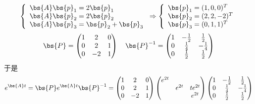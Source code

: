 \documentclass[12pt, a4paper, oneside, UTF8]{ctexbook}
\begin{document}
\begin{solution}
    \begin{align*}
        \left\{
            \begin{array}{ll}
                \bs{A}\bs{p}_1=2\bs{p}_1 \\
                \bs{A}\bs{p}_2=2\bs{p}_2 \\
                \bs{A}\bs{p}_3=\bs{p}_2+\bs{p}_3
            \end{array} 
            \right.
            \Rightarrow
            \left\{
            \begin{array}{ll}
                \bs{p}_1=(1,0,0)^T \\
                \bs{p}_2=(2,2,-2)^T \\
                \bs{p}_3=(0,1,1)^T
            \end{array} 
            \right.
    \end{align*}
    \begin{align*}
        \bs{P}=\begin{pmatrix}
            1 & 2 &0 \\
            0 & 2 &1 \\
            0 & -2 & 1
        \end{pmatrix} \quad
        \bs{P}^{-1}=\begin{pmatrix}
            1 & -\frac{1}{2} &\frac{1}{2} \\
            0 & \frac{1}{4} &-\frac{1}{4} \\
            0 & \frac{1}{2}& \frac{1}{2}       
        \end{pmatrix}
    \end{align*}
    于是
    \begin{align*}
    e^{\bs{A}t}=\bs{P}e^{\bs{\Lambda}t}\bs{P}^{-1}
    =\begin{pmatrix}
        1 & 2 &0 \\
        0 & 2 &1 \\
        0 & -2 & 1
    \end{pmatrix} \begin{pmatrix}
        e^{2t} & &\\
        & e^{2t}&te^{2t} \\
        & & e^{2t}
    \end{pmatrix} \begin{pmatrix}
        1 & -\frac{1}{2} &\frac{1}{2} \\
        0 & \frac{1}{4} &-\frac{1}{4} \\
        0 & \frac{1}{2}& \frac{1}{2} 
    \end{pmatrix}

\end{align*}
\end{solution}
\end{document}
